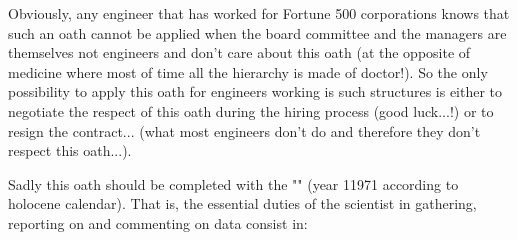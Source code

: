 	\begin{tcolorbox}[title=Remark,arc=10pt,breakable,drop lifted shadow,
  skin=enhanced,
  skin first is subskin of={enhancedfirst}{arc=10pt,no shadow},
  skin middle is subskin of={enhancedmiddle}{arc=10pt,no shadow},
  skin last is subskin of={enhancedlast}{drop lifted shadow}]
	Obviously, any engineer that has worked for Fortune 500 corporations knows that such an oath cannot be applied when the board committee and the managers are themselves not engineers and don't care about this oath (at the opposite of medicine where most of time all the hierarchy is made of doctor!). So the only possibility to apply this oath for engineers working is such structures is either to negotiate the respect of this oath during the hiring process (good luck...!) or to resign the contract... (what most engineers don't do and therefore they don't respect this oath...).
	\end{tcolorbox}
Sadly this oath should be completed with the "" (year 11971 according to holocene calendar). That is, the essential duties of the scientist in gathering, reporting on and commenting on data consist in:
